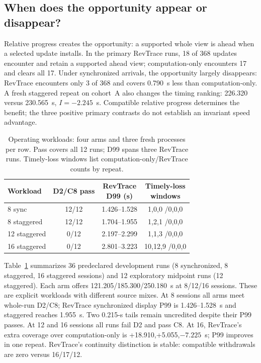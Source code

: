 \subsection{When does the opportunity appear or disappear?}
Relative progress creates the opportunity: a supported whole view is
ahead when a selected update installs. In the primary RevTrace runs,
18 of 368 updates encounter and retain a supported ahead view;
computation-only encounters 17 and clears all 17. Under
synchronized arrivals, the opportunity largely disappears: RevTrace
encounters only 3 of 368 and covers 0.790~s
less than computation-only. A fresh staggered repeat on cohort~A also
changes the timing ranking: 226.320 versus 230.565~s, $I=-2.245$~s.
Compatible relative progress determines the benefit; the three positive
primary contrasts do not establish an invariant speed advantage.

\begin{table}[t]
\centering
\caption{Operating workloads: four arms and three fresh processes per row.
Pass covers all 12 runs; D99 spans three RevTrace runs. Timely-loss windows
list computation-only/RevTrace counts by repeat.}
\label{tab:operating_workloads}
\small\setlength{\tabcolsep}{3pt}
\begin{tabular}{@{}lccc@{}}
\toprule
Workload & D2/C8 pass & \shortstack{RevTrace\\D99 (s)} &
\shortstack{Timely-loss\\windows}\\
\midrule
8 sync &12/12 &1.426--1.528 &1,0,0 /0,0,0\\
8 staggered &12/12 &1.704--1.955 &1,2,1 /0,0,0\\
12 staggered &0/12 &2.197--2.299 &1,1,3 /0,0,0\\
16 staggered &0/12 &2.801--3.223 &10,12,9 /0,0,0\\
\bottomrule
\end{tabular}
\end{table}

Table~\ref{tab:operating_workloads} summarizes 36 predeclared development
runs (8 synchronized, 8 staggered, 16 staggered sessions) and 12 exploratory
midpoint runs (12 staggered). Each arm offers 121.205/185.300/250.180~s
at 8/12/16 sessions. These are explicit workloads with different source
mixes. At 8 sessions all arms meet whole-run D2/C8; RevTrace synchronized
display P99 is 1.426--1.528~s and staggered reaches 1.955~s. Two 0.215-s
tails remain uncredited despite their P99 passes. At 12 and 16 sessions
all runs fail D2 and pass C8. At 16, RevTrace's extra coverage over
computation-only is +18.910,+5.055,$-7.225$~s; P99 improves in one repeat.
RevTrace's continuity distinction is stable: compatible withdrawals are zero
versus 16/17/12.


